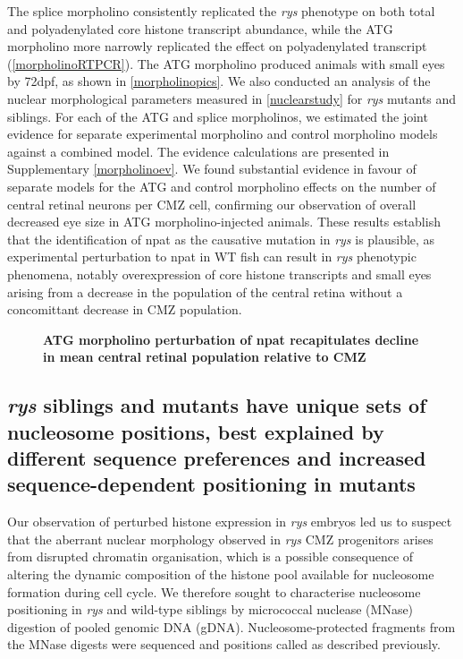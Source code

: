 The splice morpholino consistently replicated the \textit{rys} phenotype on both total and polyadenylated core histone transcript abundance, while the ATG morpholino more narrowly replicated the effect on polyadenylated transcript (\autoref{morpholinoRTPCR}). The ATG morpholino produced animals with small eyes by 72dpf, as shown in \autoref{morpholinopics}. We also conducted an analysis of the nuclear morphological parameters measured in \autoref{nuclearstudy} for \textit{rys} mutants and siblings. For each of the ATG and splice morpholinos, we estimated the joint evidence for separate experimental morpholino and control morpholino models against a combined model. The evidence calculations are presented in Supplementary \autoref{morpholinoev}. We found substantial evidence in favour of separate models for the ATG and control morpholino effects on the number of central retinal neurons per CMZ cell, confirming our observation of overall decreased eye size in ATG morpholino-injected animals. These results establish that the identification of npat as the causative mutation in \textit{rys} is plausible, as experimental perturbation to npat in WT fish can result in \textit{rys} phenotypic phenomena, notably overexpression of core histone transcripts and small eyes arising from a decrease in the population of the central retina without a concomittant decrease in CMZ population. 

\begin{figure}[!h]
    \caption{{\bf ATG morpholino perturbation of npat recapitulates decline in mean  central retinal population relative to CMZ}}
    \label{morphonucstudy}
\end{figure}

\subsection{\textit{rys} siblings and mutants have unique sets of nucleosome positions, best explained by different sequence preferences and increased sequence-dependent positioning in mutants}
 Our observation of perturbed histone expression in \textit{rys} embryos led us to suspect that the aberrant nuclear morphology observed in \textit{rys} CMZ progenitors arises from disrupted chromatin organisation, which is a possible consequence of altering the dynamic composition of the histone pool available for nucleosome formation during cell cycle. We therefore sought to characterise nucleosome positioning in \textit{rys} and wild-type siblings by micrococcal nuclease (MNase) digestion of pooled genomic DNA (gDNA). Nucleosome-protected fragments from the MNase digests were sequenced and positions called as described previously.


